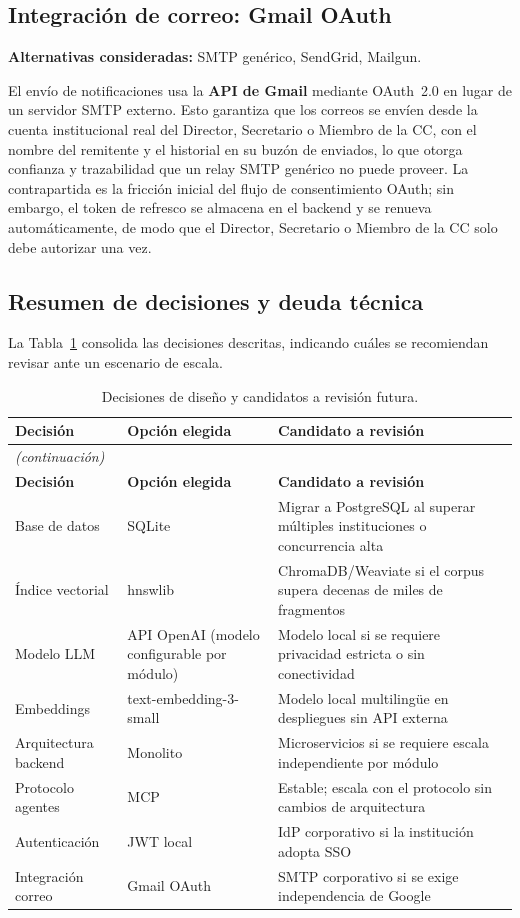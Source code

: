\subsection*{Integración de correo: Gmail OAuth}

\textbf{Alternativas consideradas:} SMTP genérico, SendGrid, Mailgun.

El envío de notificaciones usa la \textbf{API de Gmail} mediante OAuth~2.0
en lugar de un servidor SMTP externo.
Esto garantiza que los correos se envíen desde la cuenta institucional
real del Director, Secretario o Miembro de la CC, con el nombre del remitente y el historial en su
buzón de enviados, lo que otorga confianza y trazabilidad que un
relay SMTP genérico no puede proveer.
La contrapartida es la fricción inicial del flujo de consentimiento
OAuth; sin embargo, el token de refresco se almacena en el backend y
se renueva automáticamente, de modo que el Director, Secretario o Miembro de la CC solo debe autorizar
una vez.

\subsection*{Resumen de decisiones y deuda técnica}

La Tabla~\ref{tab:decisiones} consolida las decisiones descritas,
indicando cuáles se recomiendan revisar ante un escenario de escala.

\begin{longtable}{p{4.5cm}p{4.5cm}p{6cm}}
\caption{Decisiones de diseño y candidatos a revisión futura.}
\label{tab:decisiones}\\
\toprule
\textbf{Decisión} & \textbf{Opción elegida} & \textbf{Candidato a revisión} \\
\midrule
\endfirsthead
\multicolumn{3}{l}{\small\textit{(continuación)}} \\
\toprule
\textbf{Decisión} & \textbf{Opción elegida} & \textbf{Candidato a revisión} \\
\midrule
\endhead
\bottomrule
\endlastfoot
Base de datos        & SQLite             & Migrar a PostgreSQL al superar múltiples instituciones o concurrencia alta \\
Índice vectorial     & hnswlib            & ChromaDB/Weaviate si el corpus supera decenas de miles de fragmentos \\
Modelo LLM           & API OpenAI (modelo configurable por módulo) & Modelo local si se requiere privacidad estricta o sin conectividad \\
Embeddings           & text-embedding-3-small & Modelo local multilingüe en despliegues sin API externa \\
Arquitectura backend & Monolito           & Microservicios si se requiere escala independiente por módulo \\
Protocolo agentes    & MCP                & Estable; escala con el protocolo sin cambios de arquitectura \\
Autenticación        & JWT local          & IdP corporativo si la institución adopta SSO \\
Integración correo   & Gmail OAuth        & SMTP corporativo si se exige independencia de Google \\
\end{longtable}

